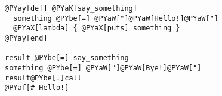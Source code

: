 \begin{Verbatim}[commandchars=@\[\]]
@PYay[def] @PYaK[say_something]
  something @PYbe[=] @PYaW["]@PYaW[Hello!]@PYaW["]
  @PYaX[lambda] { @PYaX[puts] something }
@PYay[end]

result @PYbe[=] say_something
something @PYbe[=] @PYaW["]@PYaW[Bye!]@PYaW["]
result@PYbe[.]call
@PYaf[# Hello!]
\end{Verbatim}

